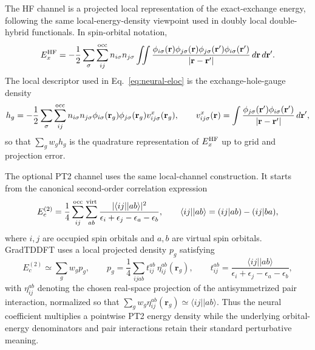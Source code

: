 The HF channel is a projected local representation of the
exact-exchange energy, following the same local-energy-density
viewpoint used in doubly local double-hybrid functionals.\cite{KovacsDLDH2026}
In spin-orbital notation,
\begin{equation}
  E_x^{\rm HF}
  =
  -\frac{1}{2}
  \sum_{\sigma}\sum_{ij}^{\rm occ}
  n_{i\sigma}n_{j\sigma}
  \iint
  \frac{
    \phi_{i\sigma}(\mathbf{r})
    \phi_{j\sigma}(\mathbf{r})
    \phi_{j\sigma}(\mathbf{r}')
    \phi_{i\sigma}(\mathbf{r}')
  }
  {|\mathbf{r}-\mathbf{r}'|}
  \,d\mathbf{r}\,d\mathbf{r}'.
  \label{eq:hf-energy}
\end{equation}
The local descriptor used in Eq.~\eqref{eq:neural-eloc} is the
exchange-hole-gauge density
\begin{equation}
  h_g
  =
  -\frac{1}{2}
  \sum_{\sigma}\sum_{ij}^{\rm occ}
  n_{i\sigma}n_{j\sigma}
  \phi_{i\sigma}(\mathbf{r}_g)
  \phi_{j\sigma}(\mathbf{r}_g)
  v_{ij\sigma}^{x}(\mathbf{r}_g),
  \qquad
  v_{ij\sigma}^{x}(\mathbf{r})
  =
  \int
  \frac{
    \phi_{j\sigma}(\mathbf{r}')
    \phi_{i\sigma}(\mathbf{r}')
  }
  {|\mathbf{r}-\mathbf{r}'|}
  \,d\mathbf{r}',
  \label{eq:hf-local-density}
\end{equation}
so that $\sum_g w_g h_g$ is the quadrature representation of
$E_x^{\rm HF}$ up to grid and projection error.

The optional PT2 channel uses the same local-channel construction.
It starts from the canonical second-order correlation expression
\begin{equation}
  E_c^{(2)}
  =
  \frac{1}{4}
  \sum_{ij}^{\rm occ}\sum_{ab}^{\rm virt}
  \frac{
    |\langle ij||ab\rangle|^2
  }
  {\epsilon_i+\epsilon_j-\epsilon_a-\epsilon_b},
  \qquad
  \langle ij||ab\rangle=(ij|ab)-(ij|ba),
  \label{eq:pt2-energy}
\end{equation}
where $i,j$ are occupied spin orbitals and $a,b$ are virtual spin
orbitals. GradTDDFT uses a local projected density $p_g$ satisfying
\begin{equation}
  E_c^{(2)}
  \simeq
  \sum_g w_g p_g,
  \qquad
  p_g
  =
  \frac{1}{4}
  \sum_{ijab}
  t_{ij}^{ab}\,\eta_{ij}^{ab}(\mathbf{r}_g),
  \qquad
  t_{ij}^{ab}
  =
  \frac{\langle ij||ab\rangle}
       {\epsilon_i+\epsilon_j-\epsilon_a-\epsilon_b},
  \label{eq:pt2-local-density}
\end{equation}
with $\eta_{ij}^{ab}$ denoting the chosen real-space projection of
the antisymmetrized pair interaction, normalized so that
$\sum_g w_g\eta_{ij}^{ab}(\mathbf{r}_g)\simeq\langle ij||ab\rangle$.
Thus the neural coefficient multiplies a pointwise PT2 energy
density while the underlying orbital-energy denominators and pair
interactions retain their standard perturbative meaning.

